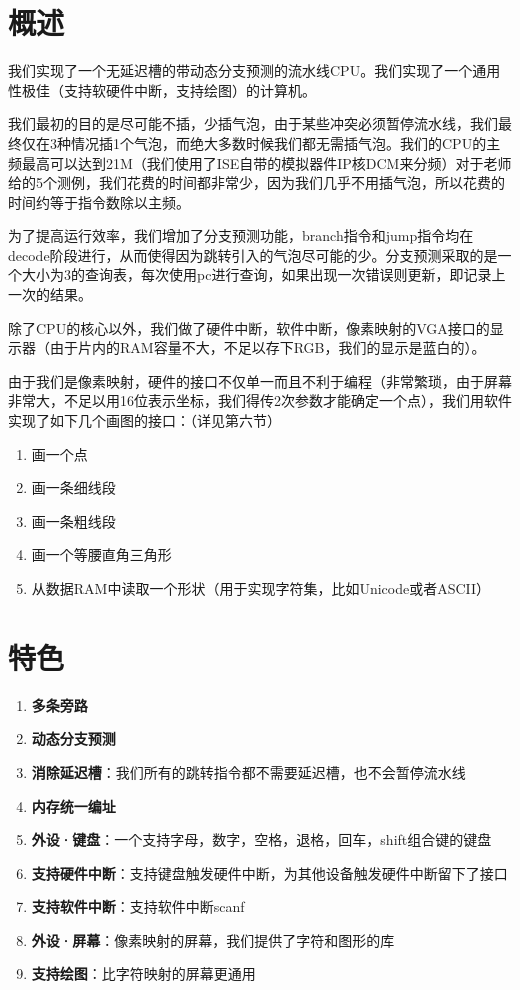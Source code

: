 \section{概述}

我们实现了一个无延迟槽的带动态分支预测的流水线CPU。我们实现了一个通用性极佳（支持软硬件中断，支持绘图）的计算机。

我们最初的目的是尽可能不插，少插气泡，由于某些冲突必须暂停流水线，我们最终仅在3种情况插1个气泡，而绝大多数时候我们都无需插气泡。我们的CPU的主频最高可以达到21M（我们使用了ISE自带的模拟器件IP核DCM来分频）对于老师给的5个测例，我们花费的时间都非常少，因为我们几乎不用插气泡，所以花费的时间约等于指令数除以主频。

为了提高运行效率，我们增加了分支预测功能，branch指令和jump指令均在decode阶段进行，从而使得因为跳转引入的气泡尽可能的少。分支预测采取的是一个大小为3的查询表，每次使用pc进行查询，如果出现一次错误则更新，即记录上一次的结果。

除了CPU的核心以外，我们做了硬件中断，软件中断，像素映射的VGA接口的显示器（由于片内的RAM容量不大，不足以存下RGB，我们的显示是蓝白的）。

由于我们是像素映射，硬件的接口不仅单一而且不利于编程（非常繁琐，由于屏幕非常大，不足以用16位表示坐标，我们得传2次参数才能确定一个点），我们用软件实现了如下几个画图的接口：（详见第六节）

\begin{enumerate}
    \item 画一个点
    \item 画一条细线段
    \item 画一条粗线段
    \item 画一个等腰直角三角形
    \item 从数据RAM中读取一个形状（用于实现字符集，比如Unicode或者ASCII）
\end{enumerate}

\section{特色}


\begin{enumerate}
    \item \textbf{多条旁路}
    \item \textbf{动态分支预测}
    \item \textbf{消除延迟槽}：我们所有的跳转指令都不需要延迟槽，也不会暂停流水线
    \item \textbf{内存统一编址}
    \item \textbf{外设·键盘}：一个支持字母，数字，空格，退格，回车，shift组合键的键盘
    \item \textbf{支持硬件中断}：支持键盘触发硬件中断，为其他设备触发硬件中断留下了接口
    \item \textbf{支持软件中断}：支持软件中断scanf
    \item \textbf{外设·屏幕}：像素映射的屏幕，我们提供了字符和图形的库
    \item \textbf{支持绘图}：比字符映射的屏幕更通用
\end{enumerate}